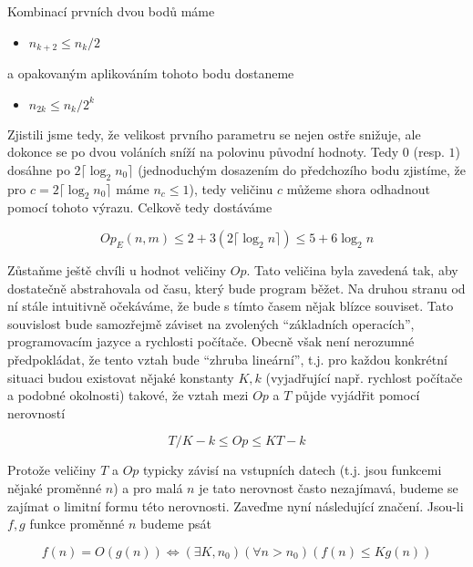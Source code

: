 Kombinací prvních dvou bodů máme

\begin{itemize}
 \item $n_{k+2}\leq n_k/2$
\end{itemize}

a opakovaným aplikováním tohoto bodu dostaneme

\begin{itemize}
 \item $n_{2k}\leq n_k/2^{k}$
\end{itemize}

Zjistili jsme tedy, že velikost prvního parametru se nejen ostře snižuje, ale dokonce se po dvou voláních sníží na polovinu původní hodnoty. Tedy
$0$ (resp. $1$) dosáhne po $2\lceil \log_2 n_0\rceil$ (jednoduchým dosazením do předchozího bodu zjistíme, že pro $c=2\lceil \log_2 n_0\rceil$ máme
$n_c\leq1$), tedy veličinu $c$ můžeme shora odhadnout pomocí tohoto výrazu. Celkově tedy dostáváme

\begin{displaymath}
 Op_E(n,m) \leq 2 + 3(2\lceil \log_2 n\rceil)\leq 5 + 6\log_2 n
\end{displaymath}

Zůstaňme ještě chvíli u hodnot veličiny $Op$. Tato veličina byla zavedená tak, aby dostatečně abstrahovala od času, který bude program běžet. 
Na druhou stranu od ní stále intuitivně očekáváme, že bude s tímto časem nějak blízce souviset. Tato souvislost bude samozřejmě záviset na
zvolených ``základních operacích'', programovacím jazyce a rychlosti počítače. Obecně však není nerozumné předpokládat, že tento vztah bude
``zhruba lineární'', t.j. pro každou konkrétní situaci budou existovat nějaké konstanty $K,k$ (vyjadřující např. rychlost počítače a podobné okolnosti) takové, 
že vztah mezi $Op$ a $T$ půjde vyjádřit pomocí nerovností

\begin{displaymath}
 T/K - k \leq Op \leq KT - k
\end{displaymath}

Protože veličiny $T$ a $Op$ typicky závisí na vstupních datech (t.j. jsou funkcemi nějaké proměnné $n$) a pro malá $n$ je tato nerovnost často
nezajímavá, budeme se zajímat o limitní formu této nerovnosti. Zaveďme nyní následující značení. Jsou-li $f,g$ funkce proměnné $n$ budeme psát

\begin{displaymath}
 f(n) = O(g(n)) \iff (\exists K,n_0)(\forall n>n_0)(f(n)\leq Kg(n))
\end{displaymath}

